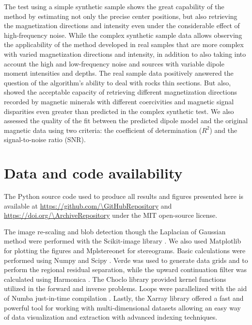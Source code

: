 The test using a simple synthetic sample shows the great capability of the method by estimating not only the precise center positions, but also retrieving the magnetization directions and intensity even under the considerable effect of high-frequency noise. While the complex synthetic sample data allows observing the applicability of the method developed in real samples that are more complex with varied magnetization directions and intensity, in addition to also taking into account the high and low-frequency noise and sources with variable dipole moment intensities and depths. The real sample data positively answered the question of the algorithm's ability to deal with rocks thin sections. But also, showed the acceptable capacity of retrieving different magnetization directions recorded by magnetic minerals with different coercivities and magnetic signal disparities even greater than predicted in the complex synthetic test. We also assessed the quality of the fit between the predicted dipole model and the original magnetic data using two criteria: the coefficient of determination ($R^2$) and the signal-to-noise ratio (SNR).


\section{Data and code availability}

The Python source code used to produce all results and figures presented here
is available at \url{https://github.com/\GitHubRepository} and
\url{https://doi.org/\ArchiveRepository} under the MIT open-source license.

The image re-scaling and blob detection though the Laplacian of Gaussian method
were performed with the Scikit-image library \citep{VanderWalt2014}. We also used Matplotlib \citep{Hunter2007} for plotting the figures and Mplstereonet \citep{xxxxx} for stereograms. Basic calculations were performed using Numpy \citep{Harris2020} and Scipy \citep{2020SciPy-NMeth}. Verde \citep{verde2018} was used to generate data grids and to perform the regional residual separation, while the upward continuation filter was calculated using Harmonica \citep{harmonica2020}. The Choclo library \citep{choclo2022} provided kernel functions utilized in the forward and inverse problems. Loops were parallelized with the aid of Numba just-in-time compilation \citep{lam2015numba}. Lastly, the Xarray library \citep{hoyer2017xarray} offered a fast and powerful tool for working with multi-dimensional datasets allowing an easy way of data visualization and extraction with advanced indexing techniques.

